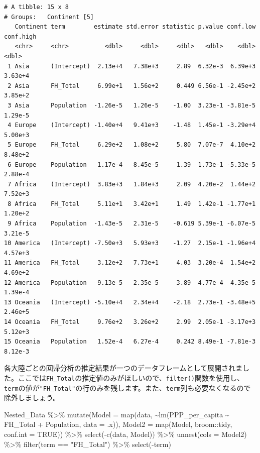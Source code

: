\documentclass[
  a4paper,
  pandoc,
  ja=standard,
  jafont=haranoaji]{bxjsbook}
\newenvironment{Shaded}{\begin{snugshade}}{\end{snugshade}}
\newcommand{\AttributeTok}[1]{\textcolor[rgb]{0.00,0.48,0.65}{#1}}
\newcommand{\ConstantTok}[1]{\textcolor[rgb]{0.56,0.35,0.01}{#1}}
\newcommand{\FunctionTok}[1]{\textcolor[rgb]{0.28,0.35,0.67}{#1}}
\newcommand{\NormalTok}[1]{\textcolor[rgb]{0.00,0.48,0.65}{#1}}
\newcommand{\SpecialCharTok}[1]{\textcolor[rgb]{0.37,0.37,0.37}{#1}}
\newcommand{\StringTok}[1]{\textcolor[rgb]{0.13,0.47,0.30}{#1}}
\begin{document}
\begin{verbatim}
# A tibble: 15 x 8
# Groups:   Continent [5]
   Continent term        estimate std.error statistic p.value conf.low conf.high
   <chr>     <chr>          <dbl>     <dbl>     <dbl>   <dbl>    <dbl>     <dbl>
 1 Asia      (Intercept)  2.13e+4   7.38e+3     2.89  6.32e-3  6.39e+3   3.63e+4
 2 Asia      FH_Total     6.99e+1   1.56e+2     0.449 6.56e-1 -2.45e+2   3.85e+2
 3 Asia      Population  -1.26e-5   1.26e-5    -1.00  3.23e-1 -3.81e-5   1.29e-5
 4 Europe    (Intercept) -1.40e+4   9.41e+3    -1.48  1.45e-1 -3.29e+4   5.00e+3
 5 Europe    FH_Total     6.29e+2   1.08e+2     5.80  7.07e-7  4.10e+2   8.48e+2
 6 Europe    Population   1.17e-4   8.45e-5     1.39  1.73e-1 -5.33e-5   2.88e-4
 7 Africa    (Intercept)  3.83e+3   1.84e+3     2.09  4.20e-2  1.44e+2   7.52e+3
 8 Africa    FH_Total     5.11e+1   3.42e+1     1.49  1.42e-1 -1.77e+1   1.20e+2
 9 Africa    Population  -1.43e-5   2.31e-5    -0.619 5.39e-1 -6.07e-5   3.21e-5
10 America   (Intercept) -7.50e+3   5.93e+3    -1.27  2.15e-1 -1.96e+4   4.57e+3
11 America   FH_Total     3.12e+2   7.73e+1     4.03  3.20e-4  1.54e+2   4.69e+2
12 America   Population   9.13e-5   2.35e-5     3.89  4.77e-4  4.35e-5   1.39e-4
13 Oceania   (Intercept) -5.10e+4   2.34e+4    -2.18  2.73e-1 -3.48e+5   2.46e+5
14 Oceania   FH_Total     9.76e+2   3.26e+2     2.99  2.05e-1 -3.17e+3   5.12e+3
15 Oceania   Population   1.52e-4   6.27e-4     0.242 8.49e-1 -7.81e-3   8.12e-3
\end{verbatim}

各大陸ごとの回帰分析の推定結果が一つのデータフレームとして展開されました。ここでは\texttt{FH\_Total}の推定値のみがほしいので、\texttt{filter()}関数を使用し、\texttt{term}の値が\texttt{"FH\_Total"}の行のみを残します。また、\texttt{term}列も必要なくなるので除外しましょう。

\begin{Shaded}
\begin{Highlighting}[numbers=left,,]
\NormalTok{Nested\_Data }\SpecialCharTok{\%\textgreater{}\%}
  \FunctionTok{mutate}\NormalTok{(}\AttributeTok{Model  =} \FunctionTok{map}\NormalTok{(data, }
                      \SpecialCharTok{\textasciitilde{}}\FunctionTok{lm}\NormalTok{(PPP\_per\_capita }\SpecialCharTok{\textasciitilde{}}\NormalTok{ FH\_Total }\SpecialCharTok{+}\NormalTok{ Population, }
                          \AttributeTok{data =}\NormalTok{ .x)),}
         \AttributeTok{Model2 =} \FunctionTok{map}\NormalTok{(Model, broom}\SpecialCharTok{::}\NormalTok{tidy, }\AttributeTok{conf.int =} \ConstantTok{TRUE}\NormalTok{)) }\SpecialCharTok{\%\textgreater{}\%}
  \FunctionTok{select}\NormalTok{(}\SpecialCharTok{{-}}\FunctionTok{c}\NormalTok{(data, Model)) }\SpecialCharTok{\%\textgreater{}\%}
  \FunctionTok{unnest}\NormalTok{(}\AttributeTok{cols =}\NormalTok{ Model2) }\SpecialCharTok{\%\textgreater{}\%}
  \FunctionTok{filter}\NormalTok{(term }\SpecialCharTok{==} \StringTok{"FH\_Total"}\NormalTok{) }\SpecialCharTok{\%\textgreater{}\%}
  \FunctionTok{select}\NormalTok{(}\SpecialCharTok{{-}}\NormalTok{term)}
\end{Highlighting}
\end{Shaded}
\end{document}
